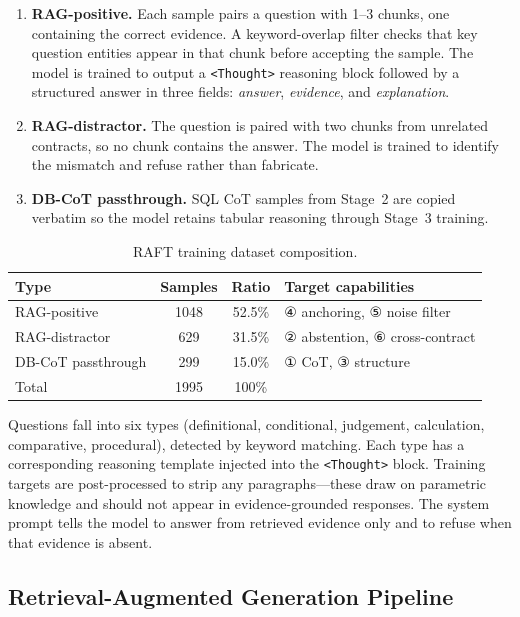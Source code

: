 \documentclass[10pt,conference]{IEEEtran}
\begin{document}
\begin{enumerate}
  \item \textbf{RAG-positive.}
    Each sample pairs a question with 1--3 chunks, one containing the correct
    evidence.
    A keyword-overlap filter checks that key question entities appear in that
    chunk before accepting the sample.
    The model is trained to output a \texttt{<Thought>} reasoning block followed
    by a structured answer in three fields: \emph{answer}, \emph{evidence}, and
    \emph{explanation}.

  \item \textbf{RAG-distractor.}
    The question is paired with two chunks from unrelated contracts, so no chunk
    contains the answer.
    The model is trained to identify the mismatch and refuse rather than
    fabricate.

  \item \textbf{DB-CoT passthrough.}
    SQL CoT samples from Stage~2 are copied verbatim so the model retains
    tabular reasoning through Stage~3 training.
\end{enumerate}

\begin{table}[htbp]
\centering
\caption{RAFT training dataset composition.}
\label{tab:raft_data}
\small
\begin{tabular}{@{}lccp{2.8cm}@{}}
\toprule
Type & Samples & Ratio & Target capabilities \\
\midrule
RAG-positive    & 1048 & 52.5\% & ④ anchoring, ⑤ noise filter \\
RAG-distractor  &  629 & 31.5\% & ② abstention, ⑥ cross-contract \\
DB-CoT passthrough & 299 & 15.0\% & ① CoT, ③ structure \\
\midrule
Total           & 1995 & 100\%  & \\
\bottomrule
\end{tabular}
\end{table}

Questions fall into six types (definitional, conditional, judgement,
calculation, comparative, procedural), detected by keyword matching.
Each type has a corresponding reasoning template injected into the
\texttt{<Thought>} block.
Training targets are post-processed to strip any paragraphs---these draw on parametric knowledge and should not
appear in evidence-grounded responses.
The system prompt tells the model to answer from retrieved evidence only and to
refuse when that evidence is absent.

\subsection{Retrieval-Augmented Generation Pipeline}
\end{document}

